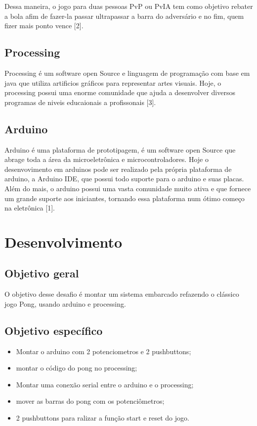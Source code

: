 \documentclass[conference]{IEEEtran}
\begin{document}
Dessa maneira, o jogo para duas pessoas PvP ou PvIA tem como objetivo
rebater a bola afim de fazer-la passar ultrapassar a barra do adversário
e no fim, quem fizer mais ponto vence [2].

\subsection{Processing}
Processing é um software open Source e linguagem de programação
com base em java que utiliza artificios gráficos para representar
artes visuais. Hoje, o processing possui uma enorme comunidade que 
ajuda a desenvolver diversos programas de niveis educaionais a profissonais [3].


\subsection{Arduino}
Arduino é uma plataforma de prototipagem, é um software open Source que abrage
toda a área da microeletrônica e microcontroladores. Hoje o desenvovimento em arduinos pode 
ser realizado pela própria plataforma de arduino, a Arduino IDE, que possui todo suporte
para o arduino e suas placas. Além do mais, o arduino possui uma vasta comunidade muito ativa 
e que fornece um grande suporte aos iniciantes, tornando essa plataforma num ótimo começo
na eletrônica [1].



\section*{Desenvolvimento}

\subsection{Objetivo geral}
O objetivo desse desafio é montar um sistema embarcado refazendo o clássico jogo Pong, usando arduino e processing.

\subsection{Objetivo específico}
    \begin{itemize}
    \item Montar o arduino com 2 potenciometros e 2 pushbuttons;
    \item montar o código do pong no processing; 
    \item Montar uma conexão serial entre o arduino e o processing;
    \item mover as barras do pong com os potenciômetros;
    \item 2 pushbuttons para ralizar a função start e reset do jogo.
    \end{itemize}
 
\end{document}
